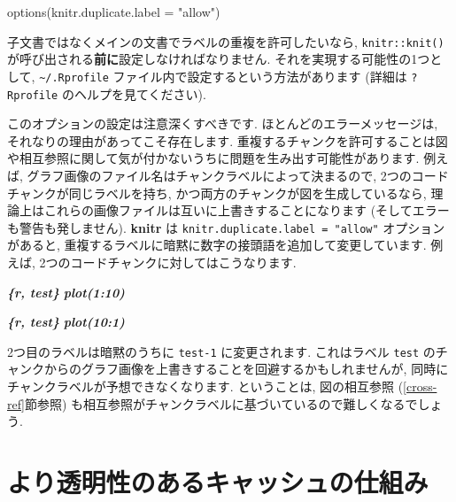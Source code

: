 \documentclass[
  11pt,
  lualatex,ja=standard,jafont=noto]{bxjsreport}
\newenvironment{Shaded}{\begin{snugshade}}{\end{snugshade}}
\newcommand{\AttributeTok}[1]{\textcolor[rgb]{0.77,0.63,0.00}{#1}}
\newcommand{\FunctionTok}[1]{\textcolor[rgb]{0.00,0.00,0.00}{#1}}
\newcommand{\InformationTok}[1]{\textcolor[rgb]{0.56,0.35,0.01}{\textbf{\textit{#1}}}}
\newcommand{\NormalTok}[1]{#1}
\newcommand{\StringTok}[1]{\textcolor[rgb]{0.31,0.60,0.02}{#1}}
\begin{document}
\begin{Shaded}
\begin{Highlighting}[numbers=left,,]
\FunctionTok{options}\NormalTok{(}\AttributeTok{knitr.duplicate.label =} \StringTok{"allow"}\NormalTok{)}
\end{Highlighting}
\end{Shaded}

子文書ではなくメインの文書でラベルの重複を許可したいなら, \texttt{knitr::knit()} が呼び出される\textbf{前に}設定しなければなりません. それを実現する可能性の1つとして, \texttt{\textasciitilde{}/.Rprofile} ファイル内で設定するという方法があります (詳細は \texttt{?Rprofile} のヘルプを見てください).

このオプションの設定は注意深くすべきです. ほとんどのエラーメッセージは, それなりの理由があってこそ存在します. 重複するチャンクを許可することは図や相互参照に関して気が付かないうちに問題を生み出す可能性があります. 例えば, グラフ画像のファイル名はチャンクラベルによって決まるので, 2つのコードチャンクが同じラベルを持ち, かつ両方のチャンクが図を生成しているなら, 理論上はこれらの画像ファイルは互いに上書きすることになります (そしてエラーも警告も発しません). \textbf{knitr} は \texttt{knitr.duplicate.label = "allow"} オプションがあると, 重複するラベルに暗黙に数字の接頭語を追加して変更しています. 例えば, 2つのコードチャンクに対してはこうなります.

\begin{Shaded}
\begin{Highlighting}[]
\InformationTok{\textasciigrave{}\textasciigrave{}\textasciigrave{}\{r, test\}}
\InformationTok{plot(1:10)}
\InformationTok{\textasciigrave{}\textasciigrave{}\textasciigrave{}}

\InformationTok{\textasciigrave{}\textasciigrave{}\textasciigrave{}\{r, test\}}
\InformationTok{plot(10:1)}
\InformationTok{\textasciigrave{}\textasciigrave{}\textasciigrave{}}
\end{Highlighting}
\end{Shaded}

2つ目のラベルは暗黙のうちに \texttt{test-1} に変更されます. これはラベル \texttt{test} のチャンクからのグラフ画像を上書きすることを回避するかもしれませんが, 同時にチャンクラベルが予想できなくなります. ということは, 図の相互参照 (\ref{cross-ref}節参照) も相互参照がチャンクラベルに基づいているので難しくなるでしょう.

\hypertarget{cache-rds}{%
\section{より透明性のあるキャッシュの仕組み}\label{cache-rds}}
\end{document}
